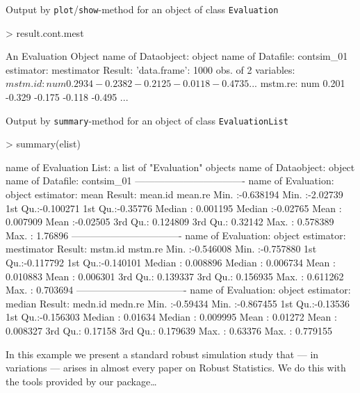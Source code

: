 \documentclass[11pt]{article}
\newcommand{\code}[1]{{\tt #1}}
\begin{document}
\par
\begin{footnotesize}
Output by \code{plot}/\code{show}-method for an object of class \code{Evaluation}
\begin{Schunk}
\begin{Sinput}
> result.cont.mest
\end{Sinput}
\begin{Soutput}
An Evaluation Object
name of Dataobject: object
name of Datafile: contsim_01
estimator: mestimator
Result: 'data.frame':	1000 obs. of  2 variables:
 $ mstm.id: num   0.2934 -0.2382 -0.2125 -0.0118 -0.4735 ...
 $ mstm.re: num   0.201 -0.329 -0.175 -0.118 -0.495 ...
\end{Soutput}
\end{Schunk}
\end{footnotesize}
\begin{footnotesize}
Output by \code{summary}-method for an object of class \code{EvaluationList}
\begin{Schunk}
\begin{Sinput}
> summary(elist)
\end{Sinput}
\begin{Soutput}
name of Evaluation List: a list of "Evaluation" objects
name of Dataobject: object
name of Datafile: contsim_01
----------------------------------
name of Evaluation: object
estimator: mean
Result:
    mean.id             mean.re        
 Min.   :-0.638194   Min.   :-2.02739  
 1st Qu.:-0.100271   1st Qu.:-0.35776  
 Median : 0.001195   Median :-0.02765  
 Mean   : 0.007909   Mean   :-0.02505  
 3rd Qu.: 0.124809   3rd Qu.: 0.32142  
 Max.   : 0.578389   Max.   : 1.76896  
----------------------------------
name of Evaluation: object
estimator: mestimator
Result:
    mstm.id             mstm.re         
 Min.   :-0.546008   Min.   :-0.757880  
 1st Qu.:-0.117792   1st Qu.:-0.140101  
 Median : 0.008896   Median : 0.006734  
 Mean   : 0.010883   Mean   : 0.006301  
 3rd Qu.: 0.139337   3rd Qu.: 0.156935  
 Max.   : 0.611262   Max.   : 0.703694  
----------------------------------
name of Evaluation: object
estimator: median
Result:
    medn.id            medn.re         
 Min.   :-0.59434   Min.   :-0.867455  
 1st Qu.:-0.13536   1st Qu.:-0.156303  
 Median : 0.01634   Median : 0.009995  
 Mean   : 0.01272   Mean   : 0.008327  
 3rd Qu.: 0.17158   3rd Qu.: 0.179639  
 Max.   : 0.63376   Max.   : 0.779155  
\end{Soutput}
\end{Schunk}
\end{footnotesize}
\begin{small}
In this example we present a standard robust simulation study that --- in variations --- arises in almost
every paper on Robust Statistics. We do this with the tools provided by our package\ldots
\end{small}
\end{document}
